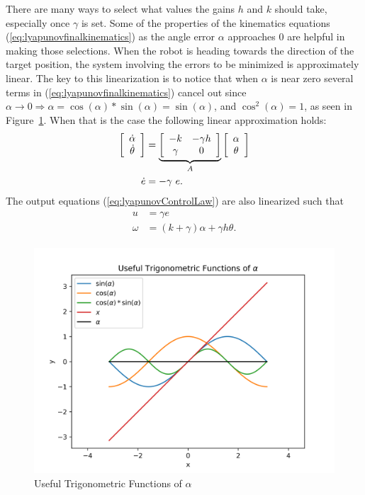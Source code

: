 There are many ways to select what values the gains $h$ and $k$ should take, especially once $\gamma$ is set. Some of the properties of the kinematics equations (\ref{eq:lyapunovfinalkinematics}) as the angle error $\alpha$ approaches $0$ are helpful in making those selections. When the robot is heading towards the direction of the target position, the system involving the errors to be minimized is approximately linear. The key to this linearization is to notice that when $\alpha$ is near zero several terms in (\ref{eq:lyapunovfinalkinematics}) cancel out since $\alpha\to0\Rightarrow \alpha=\cos(\alpha)*\sin(\alpha)=\sin(\alpha)$, and $\cos^2(\alpha)=1$, as seen in Figure~\ref{fig:plotSinCos}. When that is the case the following linear approximation holds:
\begin{align}
\label{eq:lyapunovLinearSystem}
\begin{split}
\left[\begin{array}{c} \dot{\alpha} \\ \dot{\theta} \end{array}\right]
&= \underbrace{\left[\begin{array}{c c} -k & -\gamma h \\ \gamma & 0 \end{array}\right]}_{A}
\left[\begin{array}{c} \alpha \\ \theta \end{array}\right] \\
\dot{e} &= -\gamma~e.
\end{split}
\end{align}
The output equations (\ref{eq:lyapunovControlLaw}) are also linearized such that
\begin{align}
\label{eq:lyapunovLinearOutput}
\begin{split}
u &= \gamma e \\
\omega &= (k+\gamma)\alpha + \gamma h\theta.
\end{split}
\end{align}

\begin{figure}[ht!]
\centering
\includegraphics[width=.75\textwidth]{images/plotSinCos}
\caption{Useful Trigonometric Functions of $\alpha$}%
\label{fig:plotSinCos}
\end{figure}

